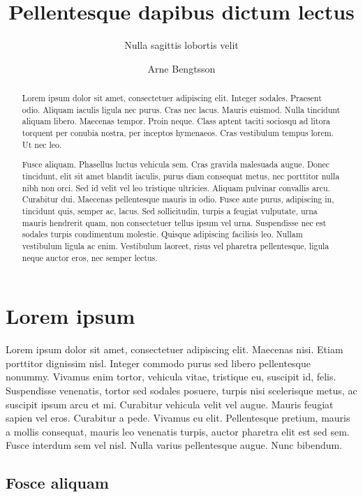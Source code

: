 \documentclass[MSc, ida]{histhesis}
\title{Pellentesque dapibus dictum lectus}
\subtitle{Nulla sagittis lobortis velit}
\author{Arne Bengtsson}
\begin{document}
\maketitle
\begin{abstract} 

Lorem ipsum dolor sit amet, consectetuer adipiscing elit.
Integer sodales. Praesent odio. Aliquam iaculis ligula nec purus. Cras nec
lacus. Mauris euismod. Nulla tincidunt aliquam libero. Maecenas tempor. Proin
neque. Class aptent taciti sociosqu ad litora torquent per conubia nostra, per
inceptos hymenaeos. Cras vestibulum tempus lorem. Ut nec leo.

Fusce aliquam. Phasellus luctus vehicula sem. Cras gravida malesuada augue.
Donec tincidunt, elit sit amet blandit iaculis, purus diam consequat metus, nec
porttitor nulla nibh non orci. Sed id velit vel leo tristique ultricies.
Aliquam pulvinar convallis arcu. Curabitur dui. Maecenas pellentesque mauris in
odio. Fusce ante purus, adipiscing in, tincidunt quis, semper ac, lacus. Sed
sollicitudin, turpis a feugiat vulputate, urna mauris hendrerit quam, non
consectetuer tellus ipsum vel urna. Suspendisse nec est sodales turpis
condimentum molestie. Quisque adipiscing facilisis leo. Nullam vestibulum
ligula ac enim. Vestibulum laoreet, risus vel pharetra pellentesque, ligula
neque auctor eros, nec semper lectus.

\end{abstract}
\tableofcontents

\section{Lorem ipsum}

Lorem ipsum dolor sit amet, consectetuer adipiscing elit. Maecenas nisi. Etiam
porttitor dignissim nisl. Integer commodo purus sed libero pellentesque
nonummy. Vivamus enim tortor, vehicula vitae, tristique eu, suscipit id, felis.
Suspendisse venenatis, tortor sed sodales posuere, turpis nisi scelerisque
metus, ac suscipit ipsum arcu et mi. Curabitur vehicula velit vel augue. Mauris
feugiat sapien vel eros. Curabitur a pede. Vivamus eu elit. Pellentesque
pretium, mauris a mollis consequat, mauris leo venenatis turpis, auctor
pharetra elit est sed sem. Fusce interdum sem vel nisl. Nulla varius
pellentesque augue. Nunc bibendum.


\subsection{Fosce aliquam}
\end{document}
